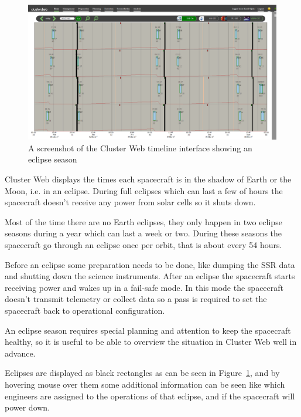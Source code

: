 \begin{figure}[ht]
  \begin{center}
    \includegraphics*[width=1\textwidth]{clusterweb_eclipses}
  \end{center}
  \caption{A screenshot of the Cluster Web timeline interface showing an eclipse season}
  \label{fig:clusterweb_eclipses}
\end{figure}

Cluster Web displays the times each spacecraft is in the shadow of Earth or the Moon, i.e. in an eclipse. During full eclipses which can last a few of hours the spacecraft doesn't receive any power from solar cells so it shuts down.

Most of the time there are no Earth eclipses, they only happen in two eclipse seasons during a year which can last a week or two. During these seasons the spacecraft go through an eclipse once per orbit, that is about every 54 hours.

Before an eclipse some preparation needs to be done, like dumping the SSR data and shutting down the science instruments. After an eclipse the spacecraft starts receiving power and wakes up in a fail-safe mode. In this mode the spacecraft doesn't transmit telemetry or collect data so a pass is required to set the spacecraft back to operational configuration.

 An eclipse season requires special planning and attention to keep the spacecraft healthy, so it is useful to be able to overview the situation in Cluster Web well in advance.
 
 Eclipses are displayed as black rectangles as can be seen in Figure~\ref{fig:clusterweb_eclipses}, and by hovering mouse over them some additional information can be seen like which engineers are assigned to the operations of that eclipse, and if the spacecraft will power down.
 
